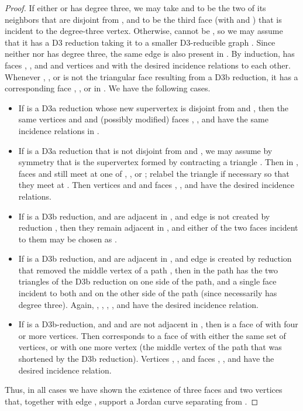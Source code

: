 \documentclass{article}
\begin{document}
\begin{proof}
If either  or  has degree three, we may take  and  to be the two of its neighbors that are disjoint from , and  to be the third face (with  and ) that is incident to the degree-three vertex. Otherwise,  cannot be , so we may assume that it has a D3 reduction  taking it to a smaller D3-reducible graph . Since neither  nor  has degree three, the same edge  is also present in . By induction,  has faces , , and  and vertices  and  with the desired incidence relations to each other.
Whenever , , or  is not the triangular face resulting from a D3b reduction, it has a corresponding face , , or  in . We have the following cases.
\begin{itemize}
\item If  is a D3a reduction whose new supervertex is disjoint from  and , then the same vertices  and  and (possibly modified) faces , , and  have the same incidence relations in .
\item If  is a D3a reduction that is not disjoint from  and , we may assume by symmetry that  is the supervertex formed by contracting a triangle . Then in , faces  and  still meet at one of , , or ; relabel the triangle if necessary so that they meet at .
Then vertices  and  and faces , , and  have the desired incidence relations.
\item If  is a D3b reduction,   and  are adjacent in , and edge  is not created by reduction , then they remain adjacent in , and either of the two faces incident to them may be chosen as .
\item If  is a D3b reduction,   and  are adjacent in , and edge  is created by reduction  that removed the middle vertex  of a path , then in  the path  has the two triangles of the D3b reduction on one side of the path, and a single face  incident to both  and  on the other side of the path (since  necessarily has degree three). Again, , , , , and  have the desired incidence relation.
\item If  is a D3b-reduction, and  and  are not adjacent in , then  is a face of  with four or more vertices. Then  corresponds to a face  of  with either the same set of vertices, or with one more vertex (the middle vertex  of the path that was shortened by the D3b reduction). Vertices , , and faces , , and  have the desired incidence relation.
\end{itemize}
Thus, in all cases we have shown the existence of three faces and two vertices that, together with edge , support a Jordan curve separating  from .
\end{proof}
\end{document}
